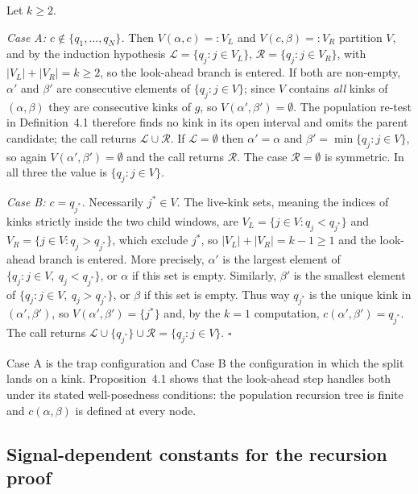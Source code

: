 \documentclass[12pt, a4paper]{article}
\newcommand{\qed}{\hfill$\square$}
\newcommand{\defpop}{Definition~4.1}
\newcommand{\proppop}{Proposition~4.1}
\begin{document}
Let $k \ge 2$.

\emph{Case A: $c \notin \{q_1,\ldots,q_N\}$.} Then $V(\alpha,c) =: V_L$ and
$V(c,\beta) =: V_R$ partition $V$, and by the induction hypothesis
$\mathcal{L} = \{q_j : j \in V_L\}$, $\mathcal{R} = \{q_j : j\in V_R\}$, with
$|V_L| + |V_R| = k \ge 2$, so the look-ahead branch is entered. If both are
non-empty, $\alpha'$ and $\beta'$ are consecutive elements of
$\{q_j : j\in V\}$; since $V$ contains \emph{all} kinks of $(\alpha,\beta)$
they are consecutive kinks of $g$, so $V(\alpha',\beta') = \emptyset$. The
population re-test in \defpop{} therefore finds no kink in its open interval
and omits the parent candidate; the call returns
$\mathcal{L}\cup\mathcal{R}$. If
$\mathcal{L} = \emptyset$ then $\alpha' = \alpha$ and
$\beta' = \min\{q_j : j\in V\}$, so again $V(\alpha',\beta') = \emptyset$ and
the call returns $\mathcal{R}$. The case $\mathcal{R} = \emptyset$ is
symmetric. In all three the value is $\{q_j : j \in V\}$.

\emph{Case B: $c = q_{j^*}$.} Necessarily $j^* \in V$. The live-kink sets,
meaning the indices of kinks strictly inside the two child windows, are
$V_L = \{j \in V: q_j < q_{j^*}\}$ and $V_R = \{j\in V : q_j > q_{j^*}\}$,
which exclude $j^*$, so $|V_L|+|V_R| = k-1 \ge 1$ and the look-ahead branch is
entered. More precisely, $\alpha'$ is the largest element of
$\{q_j:j\in V,\ q_j<q_{j^*}\}$, or $\alpha$ if this set is empty. Similarly,
$\beta'$ is the smallest element of
$\{q_j:j\in V,\ q_j>q_{j^*}\}$, or $\beta$ if this set is empty. Thus
way $q_{j^*}$ is the unique kink in $(\alpha',\beta')$, so
$V(\alpha',\beta') = \{j^*\}$ and, by the $k=1$ computation,
$c(\alpha',\beta') = q_{j^*}$. The call returns
$\mathcal{L} \cup \{q_{j^*}\} \cup \mathcal{R} = \{q_j : j\in V\}$. \qed

\medskip
Case A is the trap configuration and Case B the configuration in which the
split lands on a kink. \proppop{} shows that the look-ahead step handles both
under its stated well-posedness conditions: the population recursion tree is
finite and $c(\alpha,\beta)$ is defined at every node.

\subsection{Signal-dependent constants for the recursion proof}
\label{sup:constants}
\end{document}
